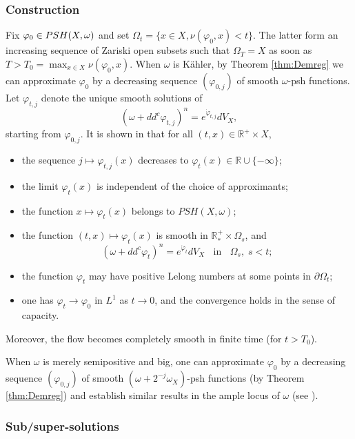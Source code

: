 \documentclass[10pt,a4paper]{amsart}
\numberwithin{equation}{section}
\newcommand{\PSH}{\textup{PSH}}
\newcommand{\R}{\mathbb R}
\newcommand{\f}{\varphi}
\begin{document}
\subsubsection*{Construction} 
Fix $\f_0 \in \PSH(X,\omega)$ and set $\Omega_t=\{x \in X, \nu(\f_0,x)<t \}$.
The latter form an increasing sequence of Zariski open subsets such that
$\Omega_T=X$ as soon as $T>T_0=\max_{x \in X} \nu(\f_0,x)$.
When $\omega$ is K\"ahler, by Theorem \ref{thm:Demreg} we can approximate $\f_0$ by a decreasing
sequence $(\f_{0,j})$ of smooth $\omega$-psh functions.
Let $\f_{t,j}$ denote the unique smooth solutions of 
$$
(\omega+dd^c \varphi_{t,j})^n = e^{\dot \varphi_{t,j}}dV_X,
$$
starting from   $\f_{0,j}$. It is shown in \cite{GZ17,DNL17} that
for all $(t,x) \in \R^+ \times X$, 
\begin{itemize}
\item the sequence  $j \mapsto \f_{t,j}(x)$ decreases to $\f_t(x) \in \R \cup \{-\infty\}$;
\item the limit $\f_t(x)$ is independent of the choice of approximants;
\item the function $x \mapsto \f_t(x)$ belongs to $PSH(X,\omega)$;
\item the function $(t,x) \mapsto \f_t(x)$ is smooth in $\R_*^+ \times \Omega_s$, and
$$
(\omega+dd^c \varphi_{t})^n = e^{\dot \varphi_{t}}dV_X
\; \; \text{ in } \; \;
\Omega_s, \; s<t;
$$
\item the function $\f_t$ may have positive Lelong numbers at some points in $\partial \Omega_t$;
\item one has $\f_t \rightarrow \f_0$ in $L^1$ as $t \rightarrow 0$,
and the convergence holds in the sense of capacity.
\end{itemize}
Moreover,  the flow becomes completely smooth  in finite time (for $t>T_0$).

\medskip

When $\omega$ is merely semipositive and big, one can approximate $\f_0$ by a decreasing sequence $(\f_{0,j})$ of 
smooth $(\omega+2^{-j} \omega_X)$-psh functions (by Theorem \ref{thm:Demreg}) 
and establish similar results in the ample locus of $\omega$ (see \cite{Dan25}).
 





\subsubsection*{Sub/super-solutions}
 
  
\end{document}
